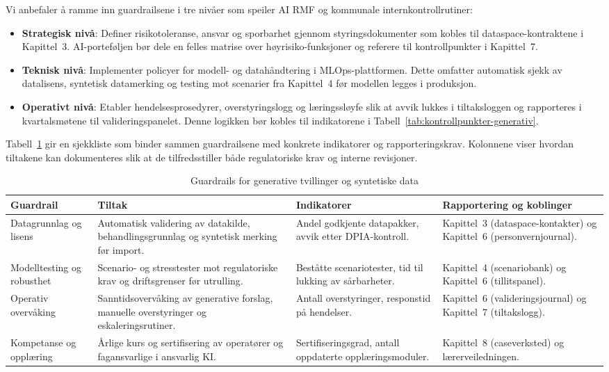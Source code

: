 Vi anbefaler å ramme inn guardrailsene i tre nivåer som speiler AI RMF og kommunale internkontrollrutiner:
\begin{itemize}
    \item \textbf{Strategisk nivå}: Definer risikotoleranse, ansvar og sporbarhet gjennom styringsdokumenter som kobles til dataspace-kontraktene i Kapittel~3. AI-porteføljen bør dele en felles matrise over høyrisiko-funksjoner og referere til kontrollpunkter i Kapittel~7.
    \item \textbf{Teknisk nivå}: Implementer policyer for modell- og datahåndtering i MLOps-plattformen. Dette omfatter automatisk sjekk av datalisens, syntetisk datamerking og testing mot scenarier fra Kapittel~4 før modellen legges i produksjon.\citep{nist2023airmf}
    \item \textbf{Operativt nivå}: Etabler hendelsesprosedyrer, overstyringslogg og læringssløyfe slik at avvik lukkes i tiltaksloggen og rapporteres i kvartalsmøtene til valideringspanelet. Denne logikken bør kobles til indikatorene i Tabell~\ref{tab:kontrollpunkter-generativ}.
\end{itemize}

Tabell~\ref{tab:guardrails-generativ} gir en sjekkliste som binder sammen guardrailsene med konkrete indikatorer og rapporteringskrav. Kolonnene viser hvordan tiltakene kan dokumenteres slik at de tilfredsstiller både regulatoriske krav og interne revisjoner.

\begin{table}[htbp]
    \centering
    \caption{Guardrails for generative tvillinger og syntetiske data}
    \label{tab:guardrails-generativ}
    \begin{tabular}{p{3.6cm}p{4.0cm}p{3.8cm}p{3.6cm}}
        \toprule
        \textbf{Guardrail} & \textbf{Tiltak} & \textbf{Indikatorer} & \textbf{Rapportering og koblinger} \\
        \midrule
        Datagrunnlag og lisens & Automatisk validering av datakilde, behandlingsgrunnlag og syntetisk merking før import. & Andel godkjente datapakker, avvik etter DPIA-kontroll. & Kapittel~3 (dataspace-kontakter) og Kapittel~6 (personvernjournal). \\
        \addlinespace
        Modelltesting og robusthet & Scenario- og stresstester mot regulatoriske krav og driftsgrenser før utrulling. & Beståtte scenariotester, tid til lukking av sårbarheter. & Kapittel~4 (scenariobank) og Kapittel~6 (tillitspanel). \\
        \addlinespace
        Operativ overvåking & Sanntidsovervåking av generative forslag, manuelle overstyringer og eskaleringsrutiner. & Antall overstyringer, responstid på hendelser. & Kapittel~6 (valideringsjournal) og Kapittel~7 (tiltakslogg). \\
        \addlinespace
        Kompetanse og opplæring & Årlige kurs og sertifisering av operatører og fagansvarlige i ansvarlig KI. & Sertifiseringsgrad, antall oppdaterte opplæringsmoduler. & Kapittel~8 (caseverksted) og lærerveiledningen. \\
        \bottomrule
    \end{tabular}
\end{table}

